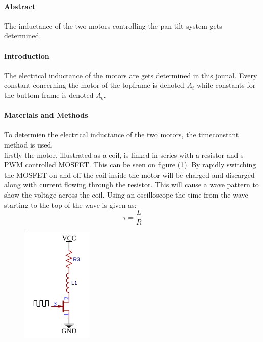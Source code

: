 \documentclass[../../main]{subfiles}
\begin{document}
\paragraph{Abstract}

The inductance of the two motors controlling the pan-tilt system gets determined.

\paragraph{Introduction}

The electrical inductance of the motors are gets determined in this jounal. Every constant concerning the motor of the topframe is denoted $A_t$ while constants for the buttom frame is denoted $A_b$.

\paragraph{Materials and Methods}

To determien the electrical inductance of the two motors, the timeconstant method is used.\\
firstly the motor, illustrated as a coil, is linked in series with a resistor and s PWM controlled MOSFET. This can be seen on figure (\ref{fig:inductance_circuit}). By rapidly switching the MOSFET on and off the coil inside the motor will be charged and discarged along with current flowing through the resistor. This will cause a wave pattern to show the voltage across the coil. Using an oscilloscope the time from the wave starting to the top of the wave is given as:
$$\tau = \frac{L}{R}$$

\begin{figure}[h]
  \label{fig:inductance_circuit}
  \begin{center}
    \includegraphics[width=0.3\textwidth]{circuitDiagramL.png}
  \end{center}
\end{figure}
\end{document}
